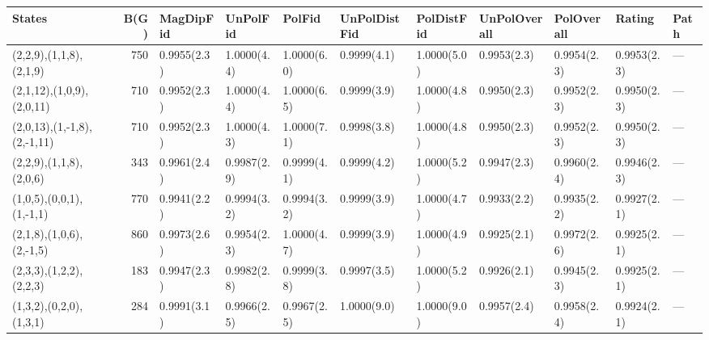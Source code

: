\begin{tabular}{lrlllllllll}
\hline
 States                      &   B(G) & MagDipFid   & UnPolFid    & PolFid      & UnPolDistFid   & PolDistFid   & UnPolOverall   & PolOverall   & Rating      & Path   \\
\hline
 (2,2,9),(1,1,8),(2,1,9)     &    750 & 0.9955(2.3) & 1.0000(4.4) & 1.0000(6.0) & 0.9999(4.1)    & 1.0000(5.0)  & 0.9953(2.3)    & 0.9954(2.3)  & 0.9953(2.3) & ---    \\
 (2,1,12),(1,0,9),(2,0,11)   &    710 & 0.9952(2.3) & 1.0000(4.4) & 1.0000(6.5) & 0.9999(3.9)    & 1.0000(4.8)  & 0.9950(2.3)    & 0.9952(2.3)  & 0.9950(2.3) & ---    \\
 (2,0,13),(1,-1,8),(2,-1,11) &    710 & 0.9952(2.3) & 1.0000(4.3) & 1.0000(7.1) & 0.9998(3.8)    & 1.0000(4.8)  & 0.9950(2.3)    & 0.9952(2.3)  & 0.9950(2.3) & ---    \\
 (2,2,9),(1,1,8),(2,0,6)     &    343 & 0.9961(2.4) & 0.9987(2.9) & 0.9999(4.1) & 0.9999(4.2)    & 1.0000(5.2)  & 0.9947(2.3)    & 0.9960(2.4)  & 0.9946(2.3) & ---    \\
 (1,0,5),(0,0,1),(1,-1,1)    &    770 & 0.9941(2.2) & 0.9994(3.2) & 0.9994(3.2) & 0.9999(3.9)    & 1.0000(4.7)  & 0.9933(2.2)    & 0.9935(2.2)  & 0.9927(2.1) & ---    \\
 (2,1,8),(1,0,6),(2,-1,5)    &    860 & 0.9973(2.6) & 0.9954(2.3) & 1.0000(4.7) & 0.9999(3.9)    & 1.0000(4.9)  & 0.9925(2.1)    & 0.9972(2.6)  & 0.9925(2.1) & ---    \\
 (2,3,3),(1,2,2),(2,2,3)     &    183 & 0.9947(2.3) & 0.9982(2.8) & 0.9999(3.8) & 0.9997(3.5)    & 1.0000(5.2)  & 0.9926(2.1)    & 0.9945(2.3)  & 0.9925(2.1) & ---    \\
 (1,3,2),(0,2,0),(1,3,1)     &    284 & 0.9991(3.1) & 0.9966(2.5) & 0.9967(2.5) & 1.0000(9.0)    & 1.0000(9.0)  & 0.9957(2.4)    & 0.9958(2.4)  & 0.9924(2.1) & ---    \\
\hline
\end{tabular}